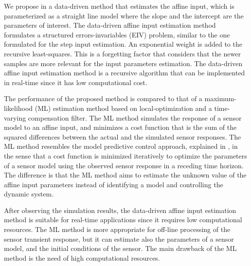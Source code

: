 We propose in \citet{QuintanaMEAS} a data-driven method that estimates the affine input,
which is parameterized as a straight line model where the slope and the intercept are the parameters of interest.
The data-driven affine input estimation method formulates a structured errors-invariables (EIV) problem, similar to the one formulated for the step input estimation.
An exponential weight is added to the recursive least-squares.
This is a forgetting factor that considers that the newer samples are more relevant for the input parameters estimation.
The data-driven affine input estimation method is a recursive algorithm that can be implemented in real-time since it has low computational cost.

The performance of the proposed method is compared to that of a maximum-likelihood (ML) estimation method based on local-optimization and a time-varying compensation filter.
The ML method simulates the response of a sensor model to an affine input, and minimizes a cost function that is the sum of the squared differences between the actual and the simulated sensor responses. 
The ML method resembles the model predictive control approach, explained in \citet{Mayne14}, in the sense that a cost function is minimized iteratively to optimize the parameters of a sensor model using the observed sensor response in a receding time horizon.
The difference is that the ML method aims to estimate the unknown value of the affine input parameters instead of identifying a model and controlling the dynamic system. 
 
After observing the simulation results, the data-driven affine input estimation method is suitable for real-time applications since it requires low computational resources. 
The ML method is more appropriate for off-line processing of the sensor transient response, but
it can estimate also the parameters of a sensor model, and the initial conditions of the sensor.
The main drawback of the ML method is the need of high computational resources.


 

